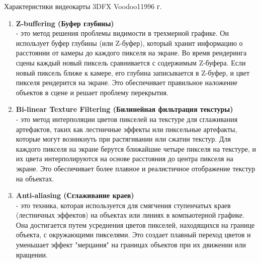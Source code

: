 \documentclass{beamer}
\begin{document}
\begin{frame}{Характеристики видеокарты 3DFX Voodoo1}{1996 г.}
{{\begin{enumerate}
	\item
	\textbf{Z-buffering (Буфер глубины)} \\
	- это метод решения проблемы видимости в трехмерной графике. Он использует буфер глубины (или Z-буфер), который хранит информацию о расстоянии от камеры до каждого пикселя на экране. Во время рендеринга сцены каждый новый пиксель сравнивается с содержимым Z-буфера. Если новый пиксель ближе к камере, его глубина записывается в Z-буфер, и цвет пикселя рендерится на экране. Это обеспечивает правильное наложение объектов в сцене и решает проблему перекрытия.
	
	\item
	\textbf{Bi-linear Texture Filtering (Билинейная фильтрация текстуры) } \\
	- это метод интерполяции цветов пикселей на текстуре для сглаживания артефактов, таких как лестничные эффекты или пиксельные артефакты, которые могут возникнуть при растягивании или сжатии текстур. Для каждого пикселя на экране берутся ближайшие четыре пикселя на текстуре, и их цвета интерполируются на основе расстояния до центра пикселя на экране. Это обеспечивает более плавное и реалистичное отображение текстур на объектах.
	\item
	\textbf{Anti-aliasing (Сглаживание краев)} \\
	- это техника, которая используется для смягчения ступенчатых краев (лестничных эффектов) на объектах или линиях в компьютерной графике. Она достигается путем усреднения цветов пикселей, находящихся на границе объекта, с окружающими пикселями. Это создает плавный переход цветов и уменьшает эффект "мерцания" на границах объектов при их движении или вращении.
\end{enumerate}
}
}
\end{frame}
\end{document}
